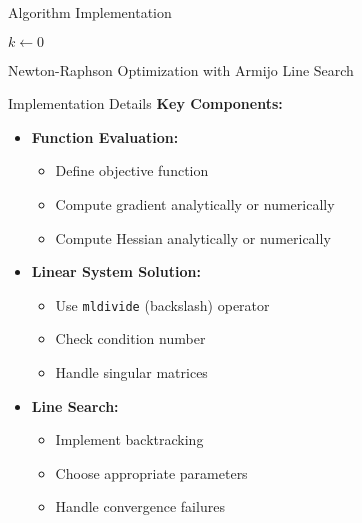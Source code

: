 \documentclass[10pt]{beamer}
\begin{document}
\begin{frame}[fragile]{Algorithm Implementation}
    \begin{algorithm2e}
    \SetAlgoLined
    
    $k \leftarrow 0$\;
    \caption{Newton-Raphson Optimization with Armijo Line Search}
    \end{algorithm2e}
\end{frame}

\begin{frame}[fragile]{Implementation Details}
    \textbf{Key Components:}
    \begin{itemize}
        \item \textbf{Function Evaluation:}
        \begin{itemize}
            \item Define objective function
            \item Compute gradient analytically or numerically
            \item Compute Hessian analytically or numerically
        \end{itemize}
        \item \textbf{Linear System Solution:}
        \begin{itemize}
            \item Use \texttt{mldivide} (backslash) operator
            \item Check condition number
            \item Handle singular matrices
        \end{itemize}
        \item \textbf{Line Search:}
        \begin{itemize}
            \item Implement backtracking
            \item Choose appropriate parameters
            \item Handle convergence failures
        \end{itemize}
    \end{itemize}
\end{frame}
\end{document}
